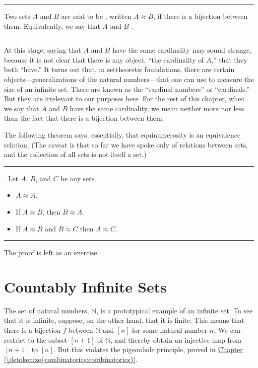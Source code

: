 \documentclass[letterpaper,10pt,english]{sphinxmanual}
\begin{document}
\bigskip\hrule\bigskip


\sphinxAtStartPar
{} Two sets \(A\) and \(B\) are said to be , written \(A \approx B\), if there is a bijection between them. Equivalently, we say that \(A\) and \(B\) .


\bigskip\hrule\bigskip


\sphinxAtStartPar
At this stage, saying that \(A\) and \(B\) have the same cardinality may sound strange, because it is not clear that there is any object, “the cardinality of \(A\),” that they both “have.” It turns out that, in set\sphinxhyphen{}theoretic foundations, there are certain objects—generalizations of the natural numbers—that one can use to measure the size of an infinite set. There are known as the “cardinal numbers” or “cardinals.” But they are irrelevant to our purposes here. For the rest of this chapter, when we say that \(A\) and \(B\) have the same cardinality, we mean neither more nor less than the fact that there is a bijection between them.

\sphinxAtStartPar
The following theorem says, essentially, that equinumerosity is an equivalence relation. (The caveat is that so far we have spoke only of relations between sets, and the collection of all sets is not itself a set.)


\bigskip\hrule\bigskip


\sphinxAtStartPar
{}. Let \(A\), \(B\), and \(C\) be any sets.
\begin{itemize}
\item {} 
\sphinxAtStartPar
\(A \approx A\).

\item {} 
\sphinxAtStartPar
If \(A \approx B\), then \(B \approx A\).

\item {} 
\sphinxAtStartPar
If \(A \approx B\) and \(B \approx C\) then \(A \approx C\).

\end{itemize}


\bigskip\hrule\bigskip


\sphinxAtStartPar
The proof is left as an exercise.


\section{Countably Infinite Sets}
\label{\detokenize{the_infinite:countably-infinite-sets}}
\sphinxAtStartPar
The set of natural numbers, \(\mathbb{N}\), is a prototypical example of an infinite set. To see that it is infinite, suppose, on the other hand, that it is finite. This means that there is a bijection \(f\) between \(\mathbb{N}\) and \([n]\) for some natural number \(n\). We can restrict to the subset \([n+1]\) of \(\mathbb{N}\), and thereby obtain an injective map from \([n+1]\) to \([n]\). But this violates the pigeonhole principle, proved in \hyperref[\detokenize{combinatorics:combinatorics}]{Chapter \ref{\detokenize{combinatorics:combinatorics}}}.
\end{document}
